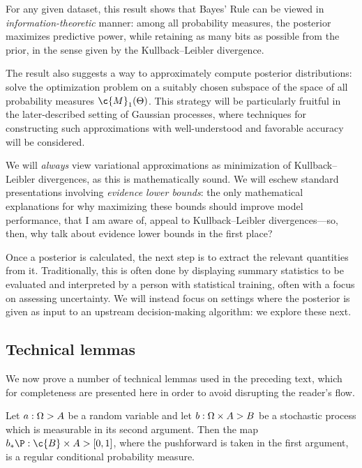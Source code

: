 \documentclass[11pt]{book}
\begin{document}
For any given dataset, this result shows that  Bayes' Rule can be viewed in \emph{information-theoretic} manner: among all probability measures, the posterior maximizes predictive power, while retaining as many bits as possible from the prior, in the sense given by the Kullback--Leibler divergence.

The result also suggests a way to approximately compute posterior distributions: solve the optimization problem on a suitably chosen subspace of the space of all probability measures $\c{M}_1(\Theta)$.
This strategy will be particularly fruitful in the later-described setting of Gaussian processes, where techniques for constructing such approximations with well-understood and favorable accuracy will be considered.

We will \emph{always} view variational approximations as minimization of Kullback--Leibler divergences, as this is mathematically sound.
We will eschew standard presentations involving \emph{evidence lower bounds}: the only mathematical explanations for why maximizing these bounds should improve model performance, that I am aware of, appeal to Kullback--Leibler divergences---so, then, why talk about evidence lower bounds in the first place?

Once a posterior is calculated, the next step is to extract the relevant quantities from it.
Traditionally, this is often done by displaying summary statistics to be evaluated and interpreted by a person with statistical training, often with a focus on assessing uncertainty.
We will instead focus on settings where the posterior is given as input to an upstream decision-making algorithm: we explore these next.

\subsection{Technical lemmas}

We now prove a number of technical lemmas used in the preceding text, which for completeness are presented here in order to avoid disrupting the reader's flow.

\begin{lemma}
\label{lem:rcrv-rvm-equiv}
Let $a : \Omega\->A$ be a random variable and let $b:\Omega\times A\->B$ be a stochastic process which is measurable in its second argument.
Then the map $b_*\P : \c{B} \x A \-> [0,1]$, where the pushforward is taken in the first argument, is a regular conditional probability measure.
\end{lemma}
\end{document}
